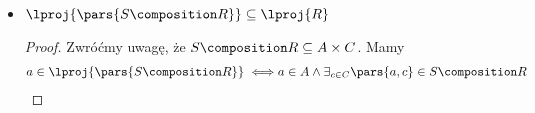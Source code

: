\begin{description}
\begin{itemize}
\begin{proof}
\begin{equation*}
\begin{split}
					            \iff     & a \in \lproj{R} \land b \in \rproj{R}                                                                                   \\
					            \iff     & \pars{a, b} \in \lproj{R} \times \rproj{R}
				            \end{split}
			            \end{equation*}
			            Pierwsze przejście jest tylko implikacją. Oczywiście jeśli \(\pars{a, b} \in R\), to możemy powiedzieć, że zarówno \(a\), jak i~\(b\) mają parę w~\(R\). Jednak z~samego faktu, że \(a\)~i~\(b\) mają parę w~\(R\), nie wynika jeszcze, że \(a\)~i~\(b\)~\emph{są} parą w~\(R\). Dlatego w~ogólnym przypadku mamy tu zaledwie inkluzję, a~nie równość, co łatwo zobaczyć na przykładzie:
			            \begin{align*}
				            A                          & = \set{a_0, a_1}                                                           \\
				            B                          & = \set{b_0, b_0}                                                           \\
				            R                          & = \set{\pars{a_0, b_0}, \pars{a_1, b_1}}                                   \\
				            \lproj{R}                  & = \pars{a_0, a_1}                                                          \\
				            \rproj{R}                  & = \pars{b_0, b_1}                                                          \\
				            \lproj{R} \times \rproj{R} & = \set{\pars{a_0, b_0}, \pars{a_0, b_1}, \pars{a_1, b_0}, \pars{a_1, b_1}} \\
				            R                          & \subsetneq \lproj{R} \times \rproj{R}
			            \end{align*}
		            \end{proof}
		      \item \(\lproj{\pars{S \composition R}} \subseteq \lproj{R}\)
		            \begin{proof}
			            Zwróćmy uwagę, że \(S \composition R \subseteq A \times C\). Mamy
			            \begin{equation*}
				            \begin{split}
					            a \in \lproj{\pars{S \composition R}}
					            \iff     & a \in A \land \exists_{c \in C} \pars{a, c} \in S \composition R                                                                  \\

\end{split}
\end{equation*}
\end{proof}
\end{itemize}
\end{description}
